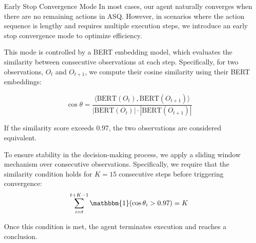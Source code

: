 Early Stop Convergence Mode
In most cases, our agent naturally converges when there are no remaining actions in ASQ. However, in scenarios where the action sequence is lengthy and requires multiple execution steps, we introduce an early stop convergence mode to optimize efficiency.

This mode is controlled by a BERT embedding model, which evaluates the similarity between consecutive observations at each step. Specifically, for two observations, \( O_t \) and \( O_{t+1} \), we compute their cosine similarity using their BERT embeddings:

$$
\cos \theta = \frac{\langle \text{BERT}(O_t), \text{BERT}(O_{t+1}) \rangle}{|\text{BERT}(O_t)| \cdot |\text{BERT}(O_{t+1})|}
$$

If the similarity score exceeds 0.97, the two observations are considered equivalent. 

To ensure stability in the decision-making process, we apply a sliding window mechanism over consecutive observations. Specifically, we require that the similarity condition holds for  $K = 15$ consecutive steps before triggering convergence:
$$
\sum_{i=t}^{t+K-1} \mathbbm{1} (\cos \theta_i > 0.97) = K
$$

Once this condition is met, the agent terminates execution and reaches a conclusion.
